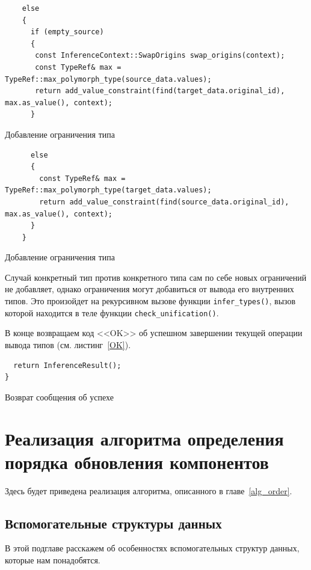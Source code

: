 \begin{ListingEnv}[h]
	\begin{lstlisting}
    else
    {
      if (empty_source)
      {
       const InferenceContext::SwapOrigins swap_origins(context);
       const TypeRef& max = TypeRef::max_polymorph_type(source_data.values);
       return add_value_constraint(find(target_data.original_id), max.as_value(), context);
      }
	\end{lstlisting}
	\caption{Добавление ограничения типа}\label{value}
\end{ListingEnv}

\begin{ListingEnv}[h]
	\begin{lstlisting}
      else
      {
        const TypeRef& max = TypeRef::max_polymorph_type(target_data.values);
        return add_value_constraint(find(source_data.original_id), max.as_value(), context);
      }
    }
	\end{lstlisting}
	\caption{Добавление ограничения типа}\label{value2}
\end{ListingEnv}

Случай конкретный тип против конкретного типа сам по себе новых ограничений не добавляет, однако ограничения могут добавиться от вывода его внутренних типов. Это произойдет на рекурсивном вызове функции \lstinline!infer_types()!, вызов которой находится в теле функции \lstinline!check_unification()!.

В конце возвращаем код <<OK>> об успешном завершении текущей операции вывода типов (см. листинг~\ref{OK}).
    
\begin{ListingEnv}[h]
	\begin{lstlisting}
  return InferenceResult();
}
	\end{lstlisting}
	\caption{Возврат сообщения об успехе}\label{OK}
\end{ListingEnv}

\section{Реализация алгоритма определения порядка обновления компонентов}
Здесь будет приведена реализация алгоритма, описанного в главе~\ref{alg_order}.
\subsection{Вспомогательные структуры данных}
В этой подглаве расскажем об особенностях вспомогательных структур данных, которые нам понадобятся.

